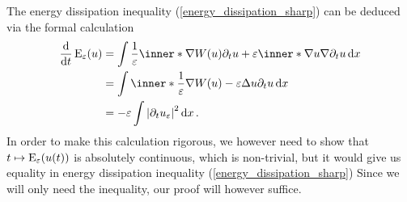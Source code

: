 \begin{remark}
	The energy dissipation inequality (\ref{energy_dissipation_sharp}) can be deduced via the formal calculation 
	\begin{align*}
		\dv{ t } \energy_{ \varepsilon } ( u )
		& =
		\int
			\frac{ 1 }{\varepsilon }
			\inner*{ \nabla W ( u ) }{ \partial_{ t } u }
			+
			\varepsilon
			\inner*{ \nabla u  }{ \nabla \partial_{ t } u }
		\dd{ x }
		\\
		& = 
		\int
			\inner*{ \frac{ 1 }{ \varepsilon } \nabla W ( u ) - \varepsilon \Delta u }{ \partial_{ t } u }
		\dd{ x }
		\\
		& =
		- \varepsilon \int \abs{ \partial_{ t } u_{ \varepsilon } }^{ 2 } \dd{ x }.
	\end{align*}
	In order to make this calculation rigorous, we however need to show that $ t \mapsto \operatorname{E}_{ \varepsilon } ( u ( t ) ) $ is absolutely continuous, which is non-trivial, but it would give us equality in energy dissipation inequality (\ref{energy_dissipation_sharp})
	Since we will only need the inequality, our proof will however suffice.
\end{remark}







